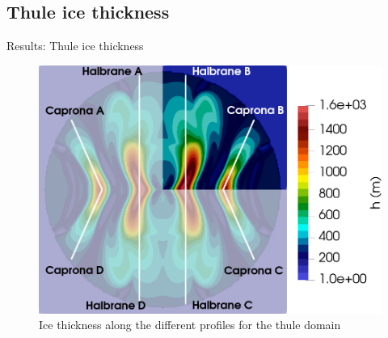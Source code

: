 \documentclass[11pt]{beamer}
\begin{document}
	\subsection{Thule ice thickness}
		\begin{frame}{Results: Thule ice thickness}
			\justifying
			\begin{figure}
				\centering
				\includegraphics[scale=0.2]{../fig/Profiles_Thule_combined_domains_2_con_fondo.png}%
				\caption
				{%
					Ice thickness along the different profiles for the thule domain%
					\label{Profiles_Thule}%
				}%
			\end{figure}
		\end{frame}
\end{document}
